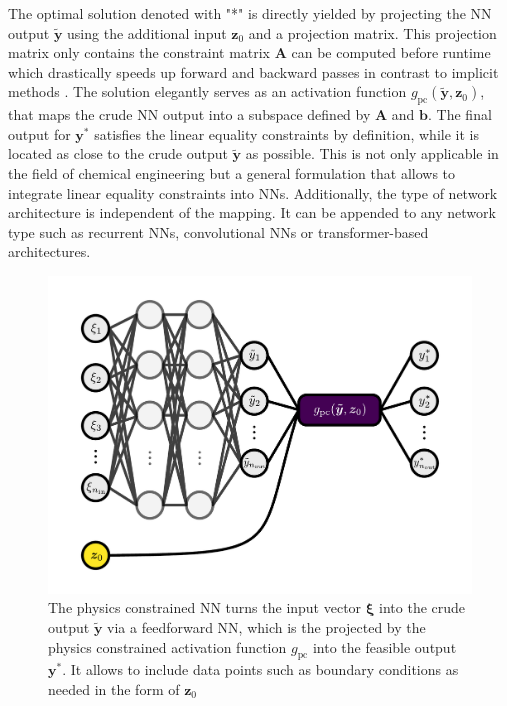 The optimal solution denoted with "*" is directly yielded by projecting the NN output $\bm{\tilde{y}}$
using the additional input $\bm{z}_0$ and a projection matrix. This projection matrix only contains the constraint matrix $\bm{A}$ can be computed
before runtime which drastically speeds up forward and backward passes in contrast to implicit methods \cite{cvxpylayers2019}.
The solution elegantly serves as an 
activation function $g_\text{pc}(\bm{\tilde{y}}, \bm{z}_0)$, that maps the crude NN output into a subspace defined by $\bm{A}$ and $\bm{b}$. The final output
for $\bm{y}^*$ satisfies the linear equality constraints by definition, while it is located as close to the crude
output $\bm{\tilde{y}}$ as possible. 
This is not only applicable in the field of chemical engineering but a 
general formulation that allows to integrate linear equality constraints into NNs.
Additionally, the type of network architecture is independent of the mapping. It can be appended to any 
network type such as recurrent NNs, convolutional NNs or transformer-based architectures.
\newline

\begin{figure}
    \centering
    \includegraphics[width=1\textwidth]{Figures/Theory/pc_neural_network.pdf}
    \caption[Neural network with physics constrained activation function $g_\text{pc}$]
    {The physics constrained NN turns the input vector $\bm{\xi}$ into the crude output $\bm{\tilde{y}}$ via
    a feedforward NN, which is the projected by the physics constrained activation function $g_\text{pc}$
    into the feasible output $\bm{y}^*$. It allows to include data points such as boundary conditions as needed in the form of $\bm{z}_0$}
    \label{theory:fig: pc_neural_network}
\end{figure}

